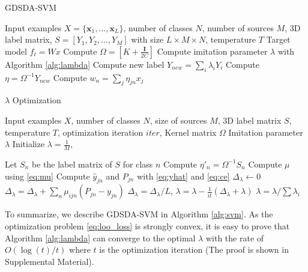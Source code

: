 \begin{algorithm}[t]
	\caption{GDSDA-SVM}\label{alg:svm}
	\begin{algorithmic}
		\Require Input examples $X=\{\textbf{x}_1,...,\textbf{x}_L\}$, number of classes $N$, number of sources $M$, 3D label matrix, $S=[Y_1,Y_2,...,Y_{M}]$ with size $L\times M \times N$, temperature $T$ %
		\Ensure Target model $f_t = Wx$
		\State Compute $\Omega=[K+\frac{\mathbf{I}}{2C}]$
		\State Compute imitation parameter $\lambda$ with Algorithm \ref{alg:lambda}
		\State Compute new label $Y_{new}=\sum_i\lambda_iY_i$
		\State Compute $\eta = \Omega^{-1}Y_{new}$
		\State Compute $w_n = \sum_j \eta_{jn}x_j$
	\end{algorithmic}	
\end{algorithm}
\begin{algorithm}[t]
	\caption{$\lambda$ Optimization}\label{alg:lambda}
\begin{algorithmic}
	\Require Input examples $X$, number of classes $N$, size of sources $M$, 3D label matrix $S$, temperature $T$, optimization iteration $iter$, Kernel matrix $\Omega$
    \Ensure Imitation parameter $\lambda$
    \State Initialize $\lambda = \frac{1}{M}$, 
    
    \State Let $S_n$ be the label matrix of $S$ for class $n$
    \State Compute $\eta'_n=\Omega^{-1}S_n$ 
    \EndFor
    \State Compute $\mu$ using \eqref{eq:mu}
	    \State Compute $\hat{y}_{jn}$ and $P_{jn}$ with \eqref{eq:yhat}  and \eqref{eq:ce}
	    \State $\Delta_{\lambda} \leftarrow 0$
	    \For {each $\textbf{x}_j$ in $X$}
		    \State $\Delta_{\lambda} = \Delta_{\lambda}+\sum_n\mu_{ijn}\left(P_{jn}-{y}_{jn}\right)$
	    \EndFor
	    \State $\Delta_{\lambda} =\Delta_{\lambda}/L$, $\lambda = \lambda - \frac{1}{it}(\Delta_{\lambda}+\lambda)$
	    \State $\lambda = \lambda / \sum\lambda_i$
    \EndFor
\end{algorithmic}	
\end{algorithm}
To summarize, we describe GDSDA-SVM in Algorithm \ref{alg:svm}. As the optimization problem \eqref{eq:loo_loss} is strongly convex, it is easy to prove that Algorithm \ref{alg:lambda} can converge to the optimal $\lambda$ with the rate of $O(\log(t)/t)$ where $t$ is the optimization iteration (The proof is shown in Supplemental Material). 




